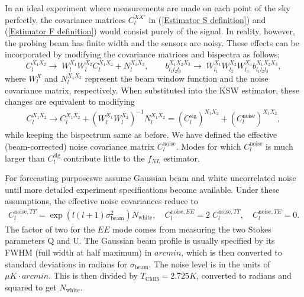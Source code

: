 \documentclass[a4paper,12pt,times,custombib,print,index]{Classes/PhDThesisPSnPDF} %
\providecommand{\DIFadd}[1]{{\protect\color{blue}\uwave{#1}}} %
\providecommand{\DIFdel}[1]{{\protect\color{red}\sout{#1}}}                      %
\providecommand{\DIFaddbegin}{} %
\providecommand{\DIFaddend}{} %
\providecommand{\DIFdelbegin}{} %
\providecommand{\DIFdelend}{} %
\newcommand{\DIFscaledelfig}{0.5}
\newlength{\DIFdelgraphicswidth} %
\newlength{\DIFdelgraphicsheight} %
\newcommand{\DIFaddincludegraphics}[2][]{{\color{blue}\fbox{\DIFOincludegraphics[#1]{#2}}}} %
\newcommand{\DIFdelincludegraphics}[2][]{%
\sbox{\DIFdelgraphicsbox}{\DIFOincludegraphics[#1]{#2}}%
\settoboxwidth{\DIFdelgraphicswidth}{\DIFdelgraphicsbox} %
\settoboxtotalheight{\DIFdelgraphicsheight}{\DIFdelgraphicsbox} %
\scalebox{\DIFscaledelfig}{%
\parbox[b]{\DIFdelgraphicswidth}{\usebox{\DIFdelgraphicsbox}\\[-\baselineskip] \rule{\DIFdelgraphicswidth}{0em}}\llap{\resizebox{\DIFdelgraphicswidth}{\DIFdelgraphicsheight}{%
\setlength{\unitlength}{\DIFdelgraphicswidth}%
\begin{picture}(1,1)%
\thicklines\linethickness{2pt} %
{\color[rgb]{1,0,0}\put(0,0){\framebox(1,1){}}}%
{\color[rgb]{1,0,0}\put(0,0){\line( 1,1){1}}}%
{\color[rgb]{1,0,0}\put(0,1){\line(1,-1){1}}}%
\end{picture}%
}\hspace*{3pt}}} %
} %
\DeclareRobustCommand{\DIFaddbegin}{\DIFOaddbegin \let\includegraphics\DIFaddincludegraphics} %
\DeclareRobustCommand{\DIFaddend}{\DIFOaddend \let\includegraphics\DIFOincludegraphics} %
\DeclareRobustCommand{\DIFdelbegin}{\DIFOdelbegin \let\includegraphics\DIFdelincludegraphics} %
\DeclareRobustCommand{\DIFdelend}{\DIFOaddend \let\includegraphics\DIFOincludegraphics} %
\begin{document}
In an ideal experiment where measurements are made on each point of the sky perfectly, the covariance matrices $C_l^{XX'}$ in (\ref{Estimator S definition}) and (\ref{Estimator F definition}) would consist purely of the signal. In reality, however, the probing beam has finite width and the sensors are noisy. These effects can be incorporated by modifying the covariance matrices and bispectra as follows;
\begin{equation}
	C_l^{X_1 X_2} \rightarrow\; W_l^{X_1} W_l^{X_2} C_l^{X_1 X_2} + N_l^{X_1 X_2} ,\qquad b_{l_1 l_2 l_3}^{X_1 X_2 X_3} \rightarrow\; W_{l_1}^{X_1} W_{l_2}^{X_2} W_{l_3}^{X_3} b_{l_1 l_2 l_3}^{X_1 X_2 X_3},
\end{equation}
where $W_l^X$ and $N_l^{X_1 X_2}$ represent the beam window function and the noise covariance matrix, respectively. When substituted into the KSW estimator, these changes are equivalent to modifying
\begin{align}
	C_l^{X_1 X_2} \rightarrow C_l^{X_1 X_2} + \left( W_l^{X_1} W_l^{X_2} \right)^{-1} N_l^{X_1 X_2} = ( C_l^\text{sig} )^{X_1 X_2} + ( C_l^\text{noise} )^{X_1 X_2},
\end{align}
while keeping the bispectrum same as before. We have defined the effective (beam-corrected) noise covariance matrix $C_l^\text{noise}$. Modes for which $C_l^\text{noise}$ is much larger than $C_l^\text{sig}$ contribute little to the \DIFdelbegin \DIFdel{$f_{NL}$ }\DIFdelend \DIFaddbegin \DIFadd{$f_\text{NL}$ }\DIFaddend estimator.

For forecasting purposes\DIFaddbegin \DIFadd{, }\DIFaddend we assume Gaussian beam and white uncorrelated noise until more detailed experiment specifications become available. Under these assumptions, the effective noise covariances reduce to \cite{Ng1999}
\begin{eqnarray}
	C_l^{\text{noise}, TT} = \exp\left({l(l+1)\sigma_\text{beam}^2} \right)N_\text{white}, \quad C_l^{\text{noise}, EE} =2\; C_l^{\text{noise}, TT}, \quad C_l^{\text{noise}, TE} = 0.
\end{eqnarray}
The factor of two for the $EE$ mode comes from measuring the two Stokes parameters Q and U. The Gaussian beam profile is usually specified by its FWHM (full width at half maximum) in \DIFdelbegin \DIFdel{$arcmin$}\DIFdelend \DIFaddbegin \DIFadd{arcmin}\DIFaddend , which is then converted to standard deviations in radians for $\sigma_\text{beam}$. The noise level is in the units of \DIFdelbegin \DIFdel{$\mu K\cdot arcmin$}\DIFdelend \DIFaddbegin \DIFadd{$\mu K\cdot \text{arcmin}$}\DIFaddend . This is then divided by $T_\text{CMB} = 2.725K$, converted to radians and squared to get $N_\text{white}$.
\end{document}
